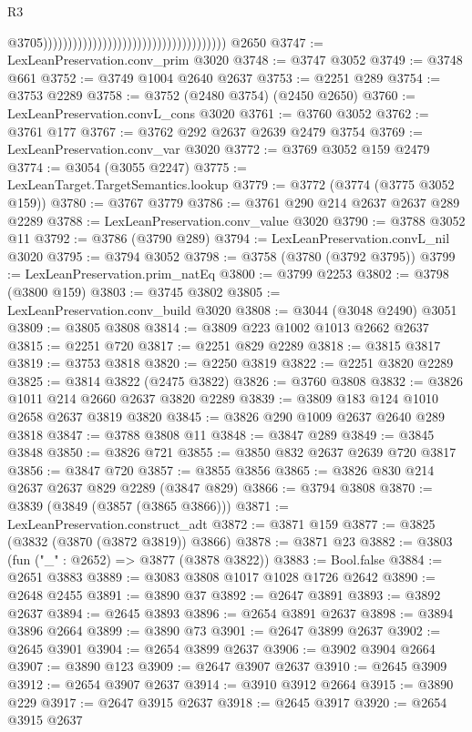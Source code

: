 \begin{lexlean}{R3}
\begin{coremodule}
                                                                              @3705)))))))))))))))))))))))))))))))))))))
    @2650
@3747 := LexLeanPreservation.conv_prim @3020
@3748 := @3747 @3052
@3749 := @3748 @661
@3752 := @3749 @1004 @2640 @2637
@3753 := @2251 @289
@3754 := @3753 @2289
@3758 := @3752 (@2480 @3754) (@2450 @2650)
@3760 := LexLeanPreservation.convL_cons @3020
@3761 := @3760 @3052
@3762 := @3761 @177
@3767 := @3762 @292 @2637 @2639 @2479 @3754
@3769 := LexLeanPreservation.conv_var @3020
@3772 := @3769 @3052 @159 @2479
@3774 := @3054 (@3055 @2247)
@3775 := LexLeanTarget.TargetSemantics.lookup
@3779 := @3772 (@3774 (@3775 @3052 @159))
@3780 := @3767 @3779
@3786 := @3761 @290 @214 @2637 @2637 @289 @2289
@3788 := LexLeanPreservation.conv_value @3020
@3790 := @3788 @3052 @11
@3792 := @3786 (@3790 @289)
@3794 := LexLeanPreservation.convL_nil @3020
@3795 := @3794 @3052
@3798 := @3758 (@3780 (@3792 @3795))
@3799 := LexLeanPreservation.prim_natEq
@3800 := @3799 @2253
@3802 := @3798 (@3800 @159)
@3803 := @3745 @3802
@3805 := LexLeanPreservation.conv_build @3020
@3808 := @3044 (@3048 @2490) @3051
@3809 := @3805 @3808
@3814 := @3809 @223 @1002 @1013 @2662 @2637
@3815 := @2251 @720
@3817 := @2251 @829 @2289
@3818 := @3815 @3817
@3819 := @3753 @3818
@3820 := @2250 @3819
@3822 := @2251 @3820 @2289
@3825 := @3814 @3822 (@2475 @3822)
@3826 := @3760 @3808
@3832 := @3826 @1011 @214 @2660 @2637 @3820 @2289
@3839 := @3809 @183 @124 @1010 @2658 @2637 @3819 @3820
@3845 := @3826 @290 @1009 @2637 @2640 @289 @3818
@3847 := @3788 @3808 @11
@3848 := @3847 @289
@3849 := @3845 @3848
@3850 := @3826 @721
@3855 := @3850 @832 @2637 @2639 @720 @3817
@3856 := @3847 @720
@3857 := @3855 @3856
@3865 := @3826 @830 @214 @2637 @2637 @829 @2289 (@3847 @829)
@3866 := @3794 @3808
@3870 := @3839 (@3849 (@3857 (@3865 @3866)))
@3871 := LexLeanPreservation.construct_adt
@3872 := @3871 @159
@3877 := @3825 (@3832 (@3870 (@3872 @3819)) @3866)
@3878 := @3871 @23
@3882 := @3803 (fun ("_" : @2652) => @3877 (@3878 @3822))
@3883 := Bool.false
@3884 := @2651 @3883
@3889 := @3083 @3808 @1017 @1028 @1726 @2642
@3890 := @2648 @2455
@3891 := @3890 @37
@3892 := @2647 @3891
@3893 := @3892 @2637
@3894 := @2645 @3893
@3896 := @2654 @3891 @2637
@3898 := @3894 @3896 @2664
@3899 := @3890 @73
@3901 := @2647 @3899 @2637
@3902 := @2645 @3901
@3904 := @2654 @3899 @2637
@3906 := @3902 @3904 @2664
@3907 := @3890 @123
@3909 := @2647 @3907 @2637
@3910 := @2645 @3909
@3912 := @2654 @3907 @2637
@3914 := @3910 @3912 @2664
@3915 := @3890 @229
@3917 := @2647 @3915 @2637
@3918 := @2645 @3917
@3920 := @2654 @3915 @2637

\end{coremodule}
\end{lexlean}

